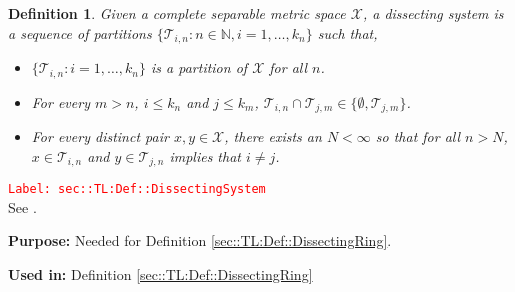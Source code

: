 \documentclass[12pt]{article}
\newcommand{\mb}{\mathbb}
\newcommand{\mc}{\mathcal}
\newcommand{\tr}{\textcolor{red}}
\newcommand{\labe}[1]{\tr{\texttt{Label: #1}}}
\newcommand{\purpose}{\textbf{Purpose: }}
\newcommand{\usein}{\textbf{Used in: }}
\newcommand{\x}{x}								%
\newcommand{\spce}{\mc{X}}						%
\newcommand{\xx}{y}								%
\renewcommand{\part}{\mc{T}}					%
\newcommand{\indcs}[2]{_{#1,#2}}				%
\newtheorem{defn}[thms]{Definition}
\begin{document}
\begin{defn}
Given a complete separable metric space \(\spce\), a dissecting system is a sequence of partitions \(\{\part\indcs{i}{n}:n \in \mb{N},i=1,\dots,k_n\}\) such that,

\begin{itemize}
\item \(\{\part\indcs{i}{n}:i=1,\dots,k_n\}\) is a partition of \(\spce\) for all \(n\).

\item For every \(m > n\), \(i \leq k_n\) and \(j \leq k_m\), \(\part\indcs{i}{n}\cap \part\indcs{j}{m} \in \{\emptyset, \part\indcs{j}{m}\}\).

\item For every distinct pair \(\x,\xx \in \spce\), there exists an \(N < \infty\) so that for all \(n > N\), \(x \in \part\indcs{i}{n}\) and \(\xx \in \part\indcs{j}{n}\) implies that \(i \neq j\).
\end{itemize}
\label{sec::TL:Def::DissectingSystem}
\end{defn}
\labe{sec::TL:Def::DissectingSystem}\\

See \cite[Definition A1.6.I]{DalVer03}.

\purpose Needed for Definition \ref{sec::TL:Def::DissectingRing}.

\usein Definition \ref{sec::TL:Def::DissectingRing}
\end{document}
